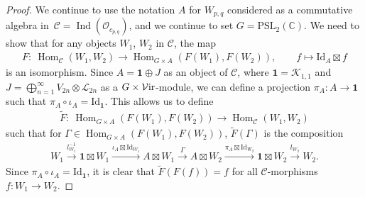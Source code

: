 \documentclass[pdftex]{sigma}
\numberwithin{equation}{section}
\theoremstyle{definition}
\begin{document}
\begin{proof}
We continue to use the notation $A$ for $W_{p,q}$ considered as a commutative algebra in~${\mathcal{C}=\operatorname{Ind}(\mathcal{O}_{c_{p,q}})}$, and we continue to set $G=\mathrm{PSL}_2(\mathbb{C})$. We need to show that for any objects $W_1$, $W_2$ in $\mathcal{C}$, the map
\begin{align*}
F\colon\ \operatorname{Hom}_\mathcal{C}(W_1,W_2) \longrightarrow\operatorname{Hom}_{G\times A}(F(W_1),F(W_2)),\qquad
 f \longmapsto \mathrm{Id}_A\boxtimes f
\end{align*}
is an isomorphism. Since $A=\mathbf{1}\oplus J$ as an object of $\mathcal{C}$, where $\mathbf{1}=\mathcal{K}_{1,1}$ and $J=\bigoplus_{n=1}^\infty V_{2n}\otimes\mathcal{L}_{2n}$ as a $G\times\mathcal{V}{\rm ir}$-module, we can define a projection $\pi_A\colon A\rightarrow\mathbf{1}$ such that $\pi_A\circ\iota_A=\mathrm{Id}_\mathbf{1}$. This allows us to define
\begin{gather*}
\widetilde{F}\colon\ \operatorname{Hom}_{G\times A}(F(W_1),F(W_2))\longrightarrow \operatorname{Hom}_\mathcal{C}(W_1,W_2)
\end{gather*}
such that for $\Gamma\in\operatorname{Hom}_{G\times A}(F(W_1),F(W_2))$, $\widetilde{F}(\Gamma)$ is the composition
\begin{gather*}
W_1\xrightarrow{l_{W_1}^{-1}} \mathbf{1}\boxtimes W_1\xrightarrow{\iota_A\boxtimes\mathrm{Id}_{W_1}} A\boxtimes W_1\xrightarrow{\Gamma} A\boxtimes W_2\xrightarrow{\pi_A\boxtimes\mathrm{Id}_{W_2}} \mathbf{1}\boxtimes W_2\xrightarrow{l_{W_2}} W_2.
\end{gather*}
Since $\pi_A\circ\iota_A=\mathrm{Id}_{\mathbf{1}}$, it is clear that $\widetilde{F}(F(f))=f$ for all $\mathcal{C}$-morphisms $f\colon W_1\rightarrow W_2$.


\end{proof}
\end{document}
